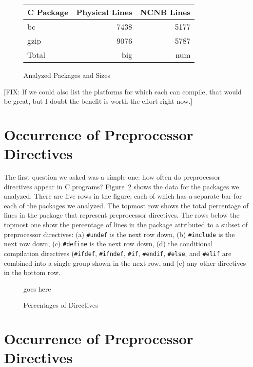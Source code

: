 \begin{figure}
\begin{tabular}{|l|r|r|}\hline
C Package & Physical Lines & NCNB Lines\\\hline\hline
bc & 7438 & 5177\\\hline
gzip & 9076 & 5787\\\hline\hline

Total & big & num\\\hline
\end{tabular}

\caption{Analyzed Packages and Sizes\label{fig:packages}}
\end{figure}

[FIX: If we could also list the platforms for which each can compile,
that would be great, but I doubt the benefit is worth the effort right
now.]

\section{Occurrence of Preprocessor Directives}\label{sec:directives}

The first question we asked was a simple one: how often do
preprocessor directives appear in C programs?
Figure~\ref{fig:directives} shows the data for the packages we
analyzed.  There are five rows in the figure, each of which has a
separate bar for each of the packages we analyzed.  The topmost row
shows the total percentage of lines in the package that represent
preprocessor directives.  The rows below the topmost one show the
percentage of lines in the package attributed to a subset of
preprocessor directives: (a) \verb+#undef+ is the next row down, (b)
\verb+#include+ is the next row down, (c) \verb+#define+ is the next
row down, (d) the conditional compilation directives (\verb+#ifdef+,
\verb+#ifndef+, \verb+#if+, \verb+#endif+, \verb+#else+, and
\verb+#elif+ are combined into a single group shown in the next row,
and (e) any other directives in the bottom row. 

\begin{figure}
goes here

\caption{Percentages of Directives\label{fig:directives}}
\end{figure}

\section{Occurrence of Preprocessor Directives}\label{sec:directives}

